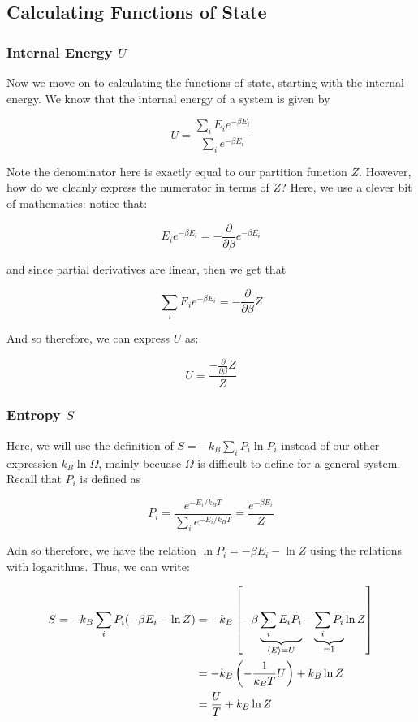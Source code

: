 \subsection{Calculating Functions of State}

\subsubsection*{Internal Energy $U$}

Now we move on to calculating the functions of state, starting with the internal energy. We know that the internal energy of a system is given by 

\[ U = \frac{\sum_i E_i e^{-\beta E_i}}{\sum_i e^{-\beta E_i}}\] 

Note the denominator here is exactly equal to our partition function $Z$. However, how do we cleanly express the numerator in terms of $Z$? Here, we use a clever bit of mathematics: notice that: 

\[ E_i e^{-\beta E_i} = - \frac{\partial}{\partial \beta} e^{-\beta E_i}\] 

and since partial derivatives are linear, then we get that 

\[ \sum_i E_i e^{-\beta E_i} = -\frac{\partial}{\partial \beta} Z\] 

And so therefore, we can express $U$ as:

\[ U = \frac{-\frac{\partial}{\partial \beta} Z}{Z}\] 

\subsubsection*{Entropy $S$}

Here, we will use the definition of $S = -k_B \sum_i P_i \ln P_i$ instead of our other expression $k_B \ln \Omega$, mainly becuase $\Omega$ is difficult to define for a general system. Recall that $P_i$ is defined as

\[ P_i = \frac{e^{-E_i/k_BT}}{\sum_i e^{-E_i/k_BT}} = \frac{e^{-\beta E_i}}{Z}\] 

Adn so therefore, we have the relation $\ln P_i = -\beta E_i - \ln Z$ using the relations with logarithms. Thus, we can write: 

\begin{align*}
    S = -k_B \sum_i P_i (-\beta E_i - \ln Z) &= -k_B \left[-\beta \underbrace{\sum_i E_i P_i}_{\langle E \rangle = U} - \underbrace{\sum_i P_i}_{= 1} \ln Z\right]\\
    &= -k_B \left( -\frac{1}{k_BT} U\right) + k_B \ln Z\\
    &= \frac{U}{T} + k_B \ln Z
\end{align*}

